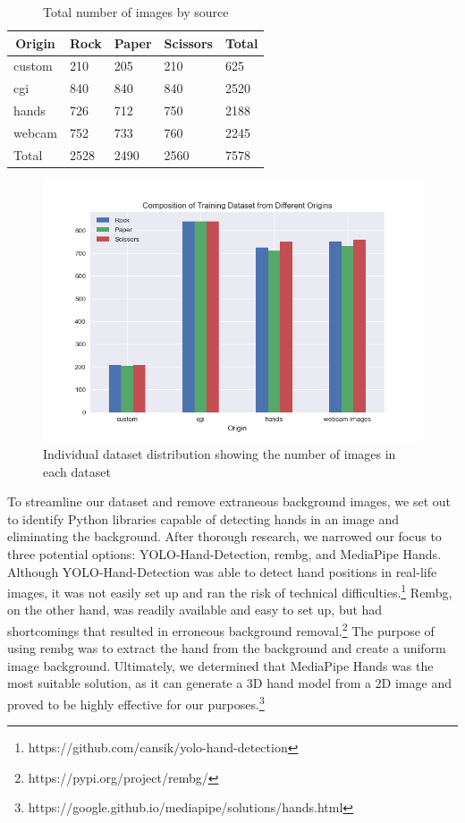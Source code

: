 \documentclass[a4paper]{article}
\begin{document}
\begin{table}
\caption{Total number of images by source}
\centering
\label{tbl:img-origin}
\begin{tabular}{@{}lllll@{}}
\toprule
\multicolumn{1}{c}{Origin} & Rock & Paper & Scissors & Total \\ \midrule
custom                     & 210  & 205   & 210      & 625   \\
cgi                        & 840  & 840   & 840      & 2520  \\
hands                      & 726  & 712   & 750      & 2188  \\
webcam                     & 752  & 733   & 760      & 2245  \\
Total                      & 2528 & 2490  & 2560     & 7578  \\ \bottomrule
\end{tabular}
\end{table}


\begin{figure}
       \centering
      \includegraphics[width=.75\textwidth]{img/ds_analysis/train_ds.png}
       \caption{Individual dataset distribution showing the number of images in each dataset}
       \label{fig:all_data}
   \end{figure} 


To streamline our dataset and remove extraneous background images, we set out to identify Python libraries capable of detecting hands in an image and eliminating the background. After thorough research, we narrowed our focus to three potential options: YOLO-Hand-Detection, rembg, and MediaPipe Hands. Although YOLO-Hand-Detection was able to detect hand positions in real-life images, it was not easily set up and ran the risk of technical difficulties.\footnote{https://github.com/cansik/yolo-hand-detection} Rembg, on the other hand, was readily available and easy to set up, but had shortcomings that resulted in erroneous background removal.\footnote{https://pypi.org/project/rembg/} The purpose of using rembg was to extract the hand from the background and create a uniform image background. Ultimately, we determined that MediaPipe Hands was the most suitable solution, as it can generate a 3D hand model from a 2D image and proved to be highly effective for our purposes.\footnote{https://google.github.io/mediapipe/solutions/hands.html}
\end{document}
